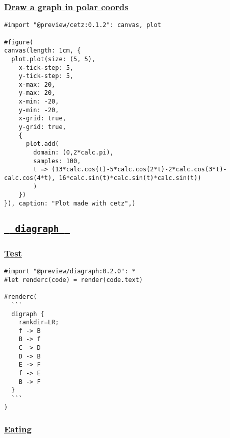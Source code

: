\pandocbounded{}

\subsubsection{\texorpdfstring{\hyperref[draw-a-graph-in-polar-coords]{Draw
a graph in polar
coords}}{Draw a graph in polar coords}}\label{draw-a-graph-in-polar-coords}

\begin{verbatim}
#import "@preview/cetz:0.1.2": canvas, plot

#figure(
canvas(length: 1cm, {
  plot.plot(size: (5, 5),
    x-tick-step: 5,
    y-tick-step: 5,
    x-max: 20,
    y-max: 20,
    x-min: -20,
    y-min: -20,
    x-grid: true,
    y-grid: true,
    {
      plot.add(
        domain: (0,2*calc.pi),
        samples: 100,
        t => (13*calc.cos(t)-5*calc.cos(2*t)-2*calc.cos(3*t)-calc.cos(4*t), 16*calc.sin(t)*calc.sin(t)*calc.sin(t))
        )
    })
}), caption: "Plot made with cetz",)
\end{verbatim}

\pandocbounded{}

\subsection{\texorpdfstring{\hyperref[diagraph]{\texttt{\ }{\texttt{\ diagraph\ }}\texttt{\ }}}{  diagraph  }}\label{diagraph}

\subsubsection{\texorpdfstring{\hyperref[test]{Test}}{Test}}\label{test}

\begin{verbatim}
#import "@preview/diagraph:0.2.0": *
#let renderc(code) = render(code.text)

#renderc(
  ```
  digraph {
    rankdir=LR;
    f -> B
    B -> f
    C -> D
    D -> B
    E -> F
    f -> E
    B -> F
  }
  ```
)
\end{verbatim}

\pandocbounded{}

\subsubsection{\texorpdfstring{\hyperref[eating]{Eating}}{Eating}}\label{eating}

